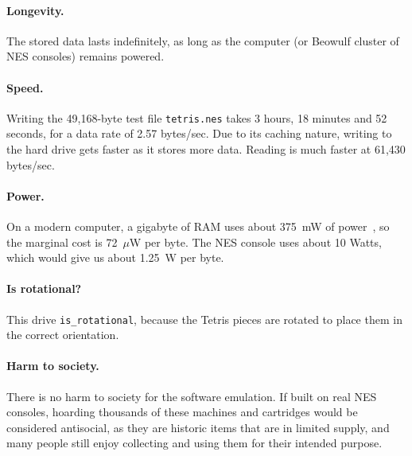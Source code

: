 \documentclass[twocolumn]{article}
\begin{document}
\paragraph{Longevity.} The stored data lasts indefinitely, as long as
the computer (or Beowulf cluster of NES consoles) remains powered.

\paragraph{Speed.} Writing the 49,168-byte test file {\tt tetris.nes}
takes 3 hours, 18 minutes and 52 seconds, for a data rate of 2.57
bytes/sec. Due to its caching nature, writing to the hard drive gets
faster as it stores more data. Reading is much faster at 61,430 bytes/sec.

% 
% 


\paragraph{Power.} On a modern computer, a gigabyte of RAM uses about
375~mW of power~\cite{crucialpower}, so the marginal cost is 72~$\mu$W
per byte. The NES console uses about 10 Watts, which would give us
about 1.25~W per byte.

\paragraph{Is rotational?} This drive \verb+is_rotational+, because the
Tetris pieces are rotated to place them in the correct orientation.

\paragraph{Harm to society.} There is no harm to society for the software
emulation. If built on real NES consoles, hoarding thousands of these
machines and cartridges would be considered antisocial, as they are
historic items that are in limited supply, and many people still enjoy
collecting and using them for their intended purpose.
\end{document}
